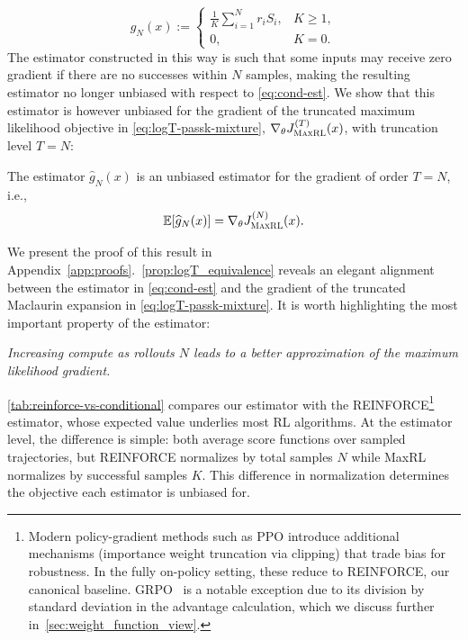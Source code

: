 \documentclass[10pt]{article} %
\begin{document}
\begin{equation}
\widehat{g}_N(x)
:=
\begin{cases}
\displaystyle
\frac{1}{K}\sum_{i=1}^N r_i S_i, & K \ge 1, \\[0.8em]
0, & K = 0.
\end{cases}
\label{eq:cond-est}
\end{equation}
The estimator constructed in this way is such that some inputs may receive zero gradient if there are no successes within $N$ samples, making the resulting estimator no longer unbiased with respect to \cref{eq:cond-est}.
We show that this estimator is however unbiased for the gradient of the
truncated maximum likelihood objective in
\cref{eq:logT-passk-mixture}, $\nabla_\theta J_{\mathrm{\textsc{MaxRL}}}^{(T)}(x)$, with truncation level $T = N$:
\begin{theorem}
\label{prop:logT_equivalence}
The estimator $\widehat{g}_N(x)$ is an unbiased estimator for the \ours{} gradient of order $T = N$, i.e.,
\[
\mathbb{E}\!\left[\widehat{g}_N(x)\right]
=
\nabla_\theta J_{\textsc{MaxRL}}^{(N)}(x).
\]
\end{theorem}
We present the proof of this result in Appendix~\ref{app:proofs}.~\cref{prop:logT_equivalence} reveals an elegant alignment between the estimator in \cref{eq:cond-est} and the gradient of the truncated Maclaurin expansion in \cref{eq:logT-passk-mixture}. It is worth highlighting the most important property of the estimator:

\begin{center}
\emph{Increasing compute as rollouts $N$ leads to a better approximation of the maximum likelihood gradient.}
\end{center}


\cref{tab:reinforce-vs-conditional} compares our estimator with the REINFORCE\footnote{
Modern policy-gradient methods such as PPO \citep{schulman2017proximalpolicyoptimizationalgorithms} introduce additional mechanisms
(importance weight truncation via clipping) that trade bias for robustness. In the 
fully on-policy setting, these reduce to REINFORCE, our canonical baseline. GRPO~\citep{shao2024deepseekmathpushinglimitsmathematical} is a notable exception due to its division by standard deviation in the advantage calculation, which we
discuss further in~\cref{sec:weight_function_view}.
} estimator, whose expected value underlies most RL algorithms.
At the estimator level, the difference is simple: both average score functions over sampled trajectories, 
but REINFORCE normalizes by total samples $N$ while MaxRL normalizes by successful 
samples $K$. This difference in normalization determines the objective each estimator is unbiased for.
\end{document}
